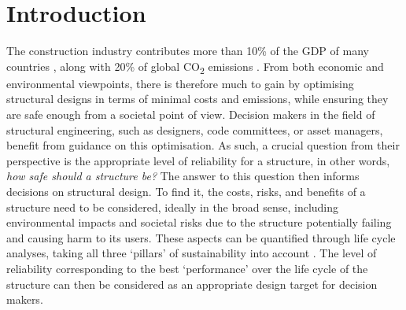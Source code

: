 \section{Introduction}


The construction industry contributes more than 10\% of the GDP of many countries \citep{RILEM2022GLOBEEnvironment}, along with 20\% of global CO\textsubscript{2} emissions \citep{Huang2018CarbonSector}.
From both economic and environmental viewpoints, there is therefore much to gain by optimising structural designs in terms of minimal costs and emissions, while ensuring they are safe enough from a societal point of view.
Decision makers in the field of structural engineering, such as designers, code committees, or asset managers, benefit from guidance on this optimisation.
As such, a crucial question from their perspective is the appropriate level of reliability for a structure, in other words, \emph{how safe should a structure be?}
The answer to this question then informs decisions on structural design.
To find it, the costs, risks, and benefits of a structure need to be considered, ideally in the broad sense, including environmental impacts and societal risks due to the structure potentially failing and causing harm to its users.
These aspects can be quantified through life cycle analyses, taking all three `pillars' of sustainability into account \citep{Knibbe2026PlaceHolder, Valdivia2021PrinciplesAssessment}.
The level of reliability corresponding to the best `performance' over the life cycle of the structure can then be considered as an appropriate design target for decision makers.

